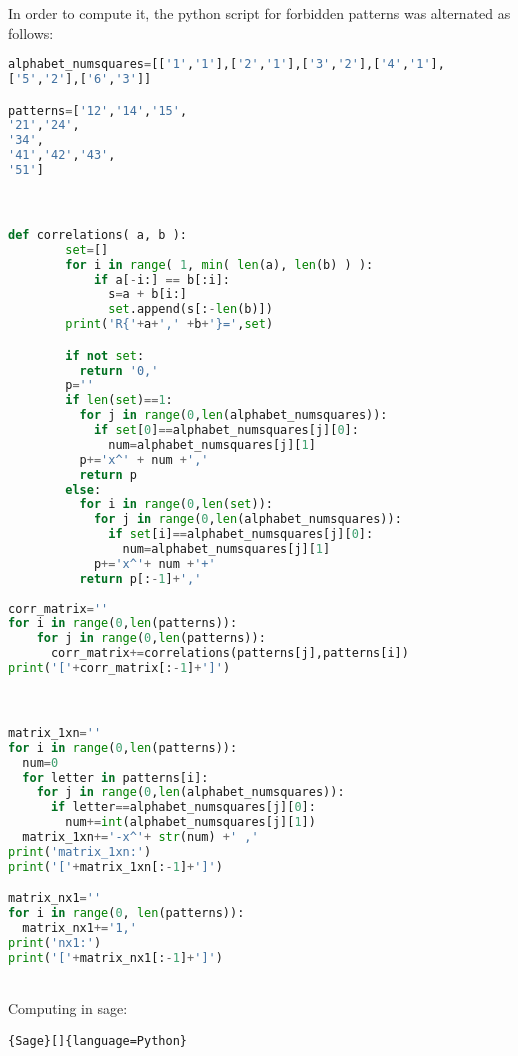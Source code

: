 \documentclass[12pt]{report}
\begin{document}
{{\noindent In order to compute it, the python script for forbidden patterns was alternated as follows: \\

{
\begin{lstlisting}[language=Python]
alphabet_numsquares=[['1','1'],['2','1'],['3','2'],['4','1'],
['5','2'],['6','3']]

patterns=['12','14','15',
'21','24',
'34',
'41','42','43',
'51']



def correlations( a, b ):
        set=[]
        for i in range( 1, min( len(a), len(b) ) ):
            if a[-i:] == b[:i]:
              s=a + b[i:]
              set.append(s[:-len(b)])
        print('R{'+a+',' +b+'}=',set)

        if not set:
          return '0,'
        p=''
        if len(set)==1:
          for j in range(0,len(alphabet_numsquares)):
            if set[0]==alphabet_numsquares[j][0]:
              num=alphabet_numsquares[j][1]
          p+='x^' + num +','
          return p
        else:
          for i in range(0,len(set)):
            for j in range(0,len(alphabet_numsquares)):
              if set[i]==alphabet_numsquares[j][0]:
                num=alphabet_numsquares[j][1]
            p+='x^'+ num +'+' 
          return p[:-1]+','
                  
corr_matrix=''
for i in range(0,len(patterns)):
    for j in range(0,len(patterns)):
      corr_matrix+=correlations(patterns[j],patterns[i])
print('['+corr_matrix[:-1]+']')



matrix_1xn=''
for i in range(0,len(patterns)):
  num=0
  for letter in patterns[i]:
    for j in range(0,len(alphabet_numsquares)):
      if letter==alphabet_numsquares[j][0]:
        num+=int(alphabet_numsquares[j][1])
  matrix_1xn+='-x^'+ str(num) +' ,'
print('matrix_1xn:')
print('['+matrix_1xn[:-1]+']')

matrix_nx1=''
for i in range(0, len(patterns)):
  matrix_nx1+='1,'
print('nx1:')
print('['+matrix_nx1[:-1]+']')

\end{lstlisting}} \quad \\

\noindent Computing in sage: \\
{
\begin{lstlisting}{Sage}[]{language=Python}


\end{lstlisting}}}}
\end{document}
